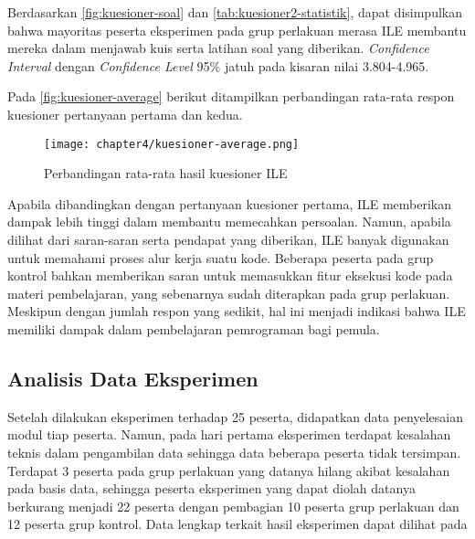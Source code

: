 Berdasarkan \autoref{fig:kuesioner-soal} dan \autoref{tab:kuesioner2-statistik}, dapat disimpulkan bahwa mayoritas peserta eksperimen pada grup perlakuan merasa ILE membantu mereka dalam menjawab kuis serta latihan soal yang diberikan. \textit{Confidence Interval} dengan \textit{Confidence Level} 95\% jatuh pada kisaran nilai 3.804-4.965.

Pada \autoref{fig:kuesioner-average} berikut ditampilkan perbandingan rata-rata respon kuesioner pertanyaan pertama dan kedua.

\begin{figure}[H]
  \centering
  \texttt{[image: chapter4/kuesioner-average.png]}
  \caption{Perbandingan rata-rata hasil kuesioner ILE} \label{fig:kuesioner-average}
\end{figure}

Apabila dibandingkan dengan pertanyaan kuesioner pertama, ILE memberikan dampak lebih tinggi dalam membantu memecahkan persoalan. Namun, apabila dilihat dari saran-saran serta pendapat yang diberikan, ILE banyak digunakan untuk memahami proses alur kerja suatu kode. Beberapa peserta pada grup kontrol bahkan memberikan saran untuk memasukkan fitur eksekusi kode pada materi pembelajaran, yang sebenarnya sudah diterapkan pada grup perlakuan. Meskipun dengan jumlah respon yang sedikit, hal ini menjadi indikasi bahwa ILE memiliki dampak dalam pembelajaran pemrograman bagi pemula.

\subsection{Analisis Data Eksperimen}
Setelah dilakukan eksperimen terhadap 25 peserta, didapatkan data penyelesaian modul tiap peserta. Namun, pada hari pertama eksperimen terdapat kesalahan teknis dalam pengambilan data sehingga data beberapa peserta tidak tersimpan. Terdapat 3 peserta pada grup perlakuan yang datanya hilang akibat kesalahan pada basis data, sehingga peserta eksperimen yang dapat diolah datanya berkurang menjadi 22 peserta dengan pembagian 10 peserta grup perlakuan dan 12 peserta grup kontrol. Data lengkap terkait hasil eksperimen dapat dilihat pada

